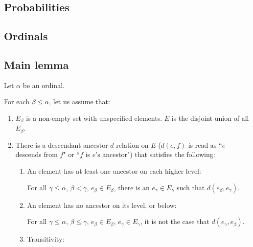 \documentclass[a4paper
,draft
]{article}
\newcommand{\ghilimele}[1]{``#1"}
\begin{document}
\subsection{Probabilities}

\subsection{Ordinals}

\subsection{Main lemma}

Let $\alpha$ be an ordinal.

For each $\beta\le\alpha$, let us assume that:
\begin{enumerate}
  \item $E_\beta$ is a non-empty set with unspecified elements.
        $E$ is the disjoint union of
        all $E_\beta$.
  \item There is a descendant-ancestor $d$ relation on $E$ ($d(e, f)$ is read as
        \ghilimele{$e$ descends from $f$} or \ghilimele{$f$ is $e$'s ancestor})
        that satisfies the following:
        \begin{enumerate}
          \item An element has at least one ancestor on each higher level:

                For all $\gamma\le\alpha$, $\beta<\gamma$,
                $e_\beta\in E_\beta$,
                there is an $e_\gamma\in E_\gamma$ such that
                $d(e_\beta, e_\gamma)$.
          \item An element has no ancestor on its level, or below:

                For all $\gamma\le\alpha$, $\beta\le\gamma$,
                $e_\beta\in E_\beta$,
                $e_\gamma\in E_\gamma$, it is not the case that
                $d(e_\gamma, e_\beta)$.
          \item Transitivity:


\end{enumerate}
\end{enumerate}
\end{document}
